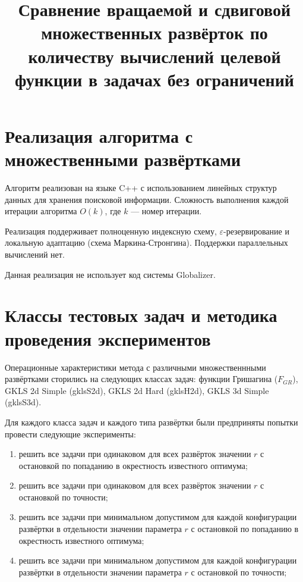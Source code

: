 \documentclass[a4paper]{article}
\begin{document}
\title{Сравнение вращаемой и сдвиговой множественных развёрток по количеству вычислений целевой функции в задачах без ограничений}
\author{}
\date{}
\maketitle

\section{Реализация алгоритма с множественными развёртками}
Алгоритм реализован на языке C++ с использованием линейных структур данных для хранения поисковой информации.
Сложность выполнения каждой итерации алгоритма $O(k)$, где $k$ --- номер итерации.

Реализация поддерживает полноценную индексную схему, $\varepsilon$-резервирование и локальную адаптацию (схема Маркина-Стронгина).
Поддержки параллельных вычислений нет.

Данная реализация не использует код системы Globalizer.

\section{Классы тестовых задач и методика проведения экспериментов}

Операционные характеристики метода с различными множественнными развёртками сторились на следующих классах задач:
функции Гришагина ($F_{GR}$), GKLS 2d Simple (gklsS2d), GKLS 2d Hard (gklsH2d), GKLS 3d Simple (gklsS3d).

Для каждого класса задач и каждого типа развёртки были предприняты попытки провести следующие эксперименты:
\begin{enumerate}
  \item решить все задачи при одинаковом для всех развёрток значении $r$ с остановкой по попаданию в окрестность известного оптимума;
  \item решить все задачи при одинаковом для всех развёрток значении $r$ с остановкой по точности;
  \item решить все задачи при минимальном допустимом для каждой конфигурации развёртки в отдельности значении параметра $r$ с остановкой по попаданию в окрестность известного оптимума;
  \item решить все задачи при минимальном допустимом для каждой конфигурации развёртки в отдельности значении параметра $r$ с остановкой по точности;
\end{enumerate}
\end{document}
